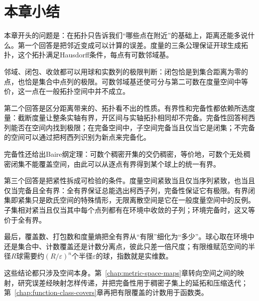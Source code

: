 \section{本章小结}
\label{sec:metric-summary}

本章开头的问题是：在拓扑只告诉我们“哪些点在附近”的基础上，距离还能多说什么。第一个回答是把邻近变成可以计算的误差。度量的三条公理保证开球生成拓扑，这个拓扑满足Hausdorff条件，每点有可数邻域基。

邻域、闭包、收敛都可以用球和实数列的极限判断：闭包恰是到集合距离为零的点，也恰是集合中点列的极限。可数邻域基还使可分与第二可数在度量空间中等价，这一点在一般拓扑空间中并不成立。

第二个回答是区分距离带来的、拓扑看不出的性质。有界性和完备性都依赖所选度量：截断度量让整条实轴有界，开区间与实轴拓扑相同却不完备。完备性回答柯西列能否在空间内找到极限；在完备空间中，子空间完备当且仅当它是闭集；不完备的空间可以通过把柯西列识别为新点来完备化。

完备性还给出Baire纲定理：可数个稠密开集的交仍稠密，等价地，可数个无处稠密闭集不能覆盖空间，由此可以从逐点有界得到某个球上的统一有界。

第三个回答是把紧性拆成可检验的条件。度量空间紧致当且仅当序列紧致，也当且仅当完备且全有界：全有界保证总能选出柯西子列，完备性保证它有极限。有界闭集即紧集只是欧氏空间的特殊情形，无限离散空间是它在一般度量空间中的反例。子集相对紧当且仅当其中每个点列都有在环境中收敛的子列；环境完备时，这又等价于全有界。

最后，覆盖数、打包数和度量熵把全有界从“有限”细化为“多少”。球心取在环境中还是集合中、计数覆盖还是计数分离点，彼此只差一倍尺度；有限维赋范空间的半径$R$球需要约$(R/\varepsilon)^n$个半径$\varepsilon$的球，指数就是实维数。

这些结论都只涉及空间本身。第~\ref{chap:metric-space-maps}章转向空间之间的映射，研究误差经映射怎样传递，并把完备性用于稠密子集上的延拓和压缩迭代；第~\ref{chap:function-class-covers}章再把有限覆盖的计数用于函数类。
